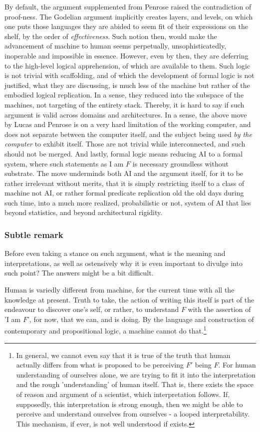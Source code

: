 By default, the argument supplemented from Penrose raised the contradiction of proof-ness. The Godelian argument implicitly creates layers, and levels, on which one puts those languages they are abided to seem fit of their expressions on the shelf, by the order of \textit{effectiveness}. Such notion then, would make the advancement of machine to human seems perpetually, unsophisticatedly, inoperable and impossible in essence. However, even by then, they are deferring to the high-level logical apprehension, of which are available to them. Such logic is not trivial with scaffolding, and of which the development of formal logic is not justified, what they are discussing, is much less of the machine but rather of the embodied logical replication. In a sense, they reduced into the subspace of the machines, not targeting of the entirety stack. Thereby, it is hard to say if such argument is valid across domains and architectures. In a sense, the above move by Lucas and Penrose is on a very hard limitation of the working computer, and does not separate between the computer itself, and the subject being used \textit{by the computer} to exhibit itself. Those are not trivial while interconnected, and such should not be merged. And lastly, formal logic means reducing AI to a formal system, where such statements as I am $F$ is necessary groundless without substrate. The move underminds both AI and the argument itself, for it to be rather irrelevant without merits, that it is simply restricting itself to a class of machine not AI, or rather formal predicate replication old the old days during such time, into a much more realized, probabilistic or not, system of AI that lies beyond statistics, and beyond architectural rigidity. 

\subsubsection{Subtle remark}
Before even taking a stance on such argument, what is the meaning and interpretations, as well as ostensively why it is even important to divulge into such point? The answers might be a bit difficult.

Human is variedly different from machine, for the current time with all the knowledge at present. Truth to take, the action of writing this itself is part of the endeavour to discover one's self, or rather, to understand $F$ with the assertion of 'I am $F$', for now, that we can, and is doing. By the language and construction of contemporary and propositional logic, a machine cannot do that.\footnote{In general, we cannot even say that it is true of the truth that human actually differs from what is proposed to be perceiving $F'$ being $F$. For human understanding of ourselves alone, we are trying to fit it into the interpretation and the rough 'understanding' of human itself. That is, there exists the space of reason and argument of a scientist, which interpretation follows. If, supposedly, this interpretation is strong enough, then we might be able to perceive and understand ourselves from ourselves - a looped interpretability. This mechanism, if ever, is not well understood if exists.}

